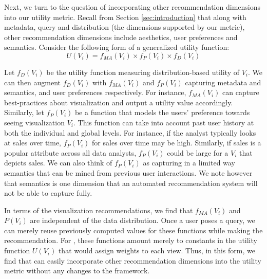 {Next, we turn to the question of incorporating other recommendation dimensions into our utility 
metric.
Recall from Section \ref{sec:introduction} that along with metadata, query and distribution (the
dimensions supported by our metric), other recommendation dimensions include aesthetics, user
preferences and semantics.
Consider the following form of a generalized utility function:
$$ U (V_i) = f_{MA}(V_i) \times f_P (V_i) \times f_D (V_i)$$

Let $f_D (V_i)$ be the utility function measuring distribution-based utility of $V_i$.
We can then augment $f_D (V_i)$ with $f_{MA}(V_i)$ and $f_P (V_i)$ capturing metadata and semantics, and user preferences respectively.
For instance, $f_{MA}(V_i)$ can capture best-practices about visualization and output a utility value accordingly.
Similarly, let $f_P (V_i)$ be a function that models the users' preference towards seeing visualization $V_i$. 
This function can take into account past user history at both the individual and global levels.
For instance, if the analyst typically looks at sales over time, $f_P (V_i)$ for sales over time
may be high.
Similarly, if sales is a popular attribute across all data analysts, $f_P (V_i)$ could be large for
a $V_i$ that depicts sales.
We can also think of $f_P (V_i)$ as capturing in a limited way semantics that can be mined from previous user interactions.
We note however that semantics is one dimension that an automated recommendation system will not be able to capture fully.

In terms of the visualization recommendations, we find that $f_{MA}(V_i)$ and $P (V_i)$ are independent
of the data distribution.
Once a user poses a query, we can merely reuse previously computed values for these functions while
making the recommendation.
For \SeeDB, these functions amount merely to constants in the utility function $U (V_i)$ that would assign weights to each view.
Thus, in this form, we find that \SeeDB can easily incorporate other recommendation dimensions into
the utility metric without any changes to the \SeeDB framework.



}%







